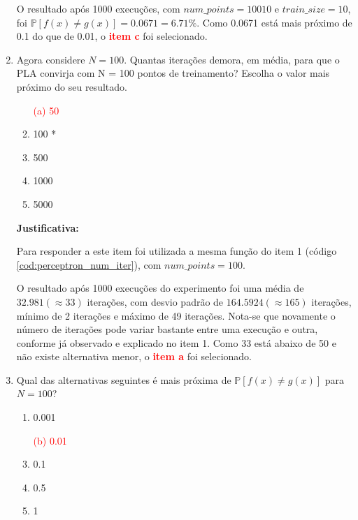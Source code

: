 \begin{enumerate}
    O resultado após 1000 execuções, com $num\_points = 10010$ e $train\_size = 10$, foi  $\mathbb{P}[f(x) \neq g(x)] = 0.0671 = 6.71\%$. Como 0.0671 está mais próximo de 0.1 do que de 0.01, o \textcolor{red}{\textbf{item c}} foi selecionado. 

    \item Agora considere $N = 100$. Quantas iterações demora, em média, para que o PLA convirja com
    N = 100 pontos de treinamento? Escolha o valor mais próximo do seu resultado.

    \begin{enumerate}
        \item[\textcolor{red}{(a)}]\textcolor{red}{50}\addtocounter{enumii}{1}
        \item 100 *
        \item 500 
        \item 1000
        \item 5000
    \end{enumerate}
     
    \par

    \textbf{Justificativa:}

    Para responder a este item foi utilizada a mesma função do item 1 (código \ref{cod:perceptron_num_iter}), com $num\_points = 100$. 
    
    O resultado após 1000 execuções do experimento foi uma média de $32.981 (\approx 33)$ iterações, com desvio padrão de $164.5924 (\approx 165)$ iterações, mínimo de 2 iterações e máximo de 49 iterações. Nota-se que novamente o número de iterações pode variar bastante entre uma execução e outra, conforme já observado e explicado no item 1. Como 33 está abaixo de 50 e não existe alternativa menor, o \textcolor{red}{\textbf{item a}} foi selecionado. 
     

    \item Qual das alternativas seguintes é mais próxima de $\mathbb{P}[f(x) \neq g(x)]$ para $N = 100$?
    
    \begin{enumerate}
        \item 0.001
        \item[\textcolor{red}{(b)}]\textcolor{red}{0.01}\addtocounter{enumii}{1}
        \item 0.1
        \item 0.5
        \item 1
    \end{enumerate}


\end{enumerate}
